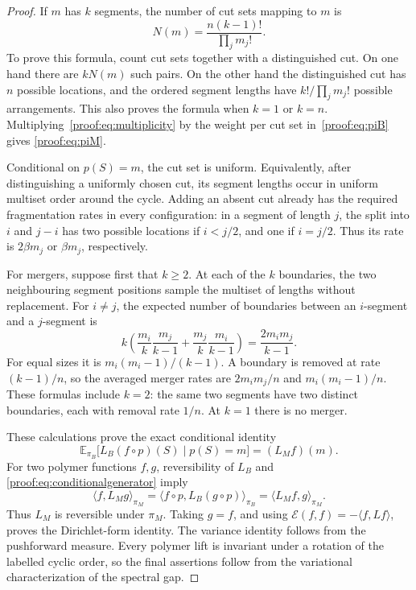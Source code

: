 \begin{proof}
If $m$ has $k$ segments, the number of cut sets mapping to $m$ is
\begin{equation}\label{proof:eq:multiplicity}
 N(m)=\frac{n(k-1)!}{\prod_jm_j!}.
\end{equation}
To prove this formula, count cut sets together with a distinguished
cut. On one hand there are $kN(m)$ such pairs. On the other hand the
distinguished cut has $n$ possible locations, and the ordered segment
lengths have $k!/\prod_jm_j!$ possible arrangements. This also proves
the formula when $k=1$ or $k=n$. Multiplying~\eqref{proof:eq:multiplicity}
by the weight per cut set in~\eqref{proof:eq:piB} gives
\eqref{proof:eq:piM}.

Conditional on $p(S)=m$, the cut set is uniform. Equivalently, after
distinguishing a uniformly chosen cut, its segment lengths occur in
uniform multiset order around the cycle. Adding an absent cut already
has the required fragmentation rates in every configuration: in a
segment of length $j$, the split into $i$ and $j-i$ has two possible
locations if $i<j/2$, and one if $i=j/2$. Thus its rate is
$2\beta m_j$ or $\beta m_j$, respectively.

For mergers, suppose first that $k\geq2$. At each of the $k$ boundaries,
the two neighbouring segment positions sample the multiset of lengths
without replacement. For $i\neq j$, the expected number of boundaries
between an $i$-segment and a $j$-segment is
\[
 k\left(\frac{m_i}{k}\frac{m_j}{k-1}
       +\frac{m_j}{k}\frac{m_i}{k-1}\right)
 =\frac{2m_im_j}{k-1}.
\]
For equal sizes it is $m_i(m_i-1)/(k-1)$. A boundary is removed at rate
$(k-1)/n$, so the averaged merger rates are $2m_im_j/n$ and
$m_i(m_i-1)/n$. These formulas include $k=2$: the same two segments
have two distinct boundaries, each with removal rate $1/n$.
At $k=1$ there is no merger.

These calculations prove the exact conditional identity
\begin{equation}\label{proof:eq:conditionalgenerator}
 \mathbb E_{\pi_B}\bigl[L_B(f\circ p)(S)\mid p(S)=m\bigr]
 =(L_Mf)(m).
\end{equation}
For two polymer functions $f,g$, reversibility of $L_B$ and
\eqref{proof:eq:conditionalgenerator} imply
\[
 \langle f,L_Mg\rangle_{\pi_M}
 =\langle f\circ p,L_B(g\circ p)\rangle_{\pi_B}
 =\langle L_Mf,g\rangle_{\pi_M}.
\]
Thus $L_M$ is reversible under $\pi_M$. Taking $g=f$, and using
$\mathcal E(f,f)=-\langle f,Lf\rangle$, proves the Dirichlet-form
identity. The variance identity follows from the pushforward measure.
Every polymer lift is invariant under a rotation of the labelled
cyclic order, so the final assertions follow from the variational
characterization of the spectral gap.
\end{proof}

